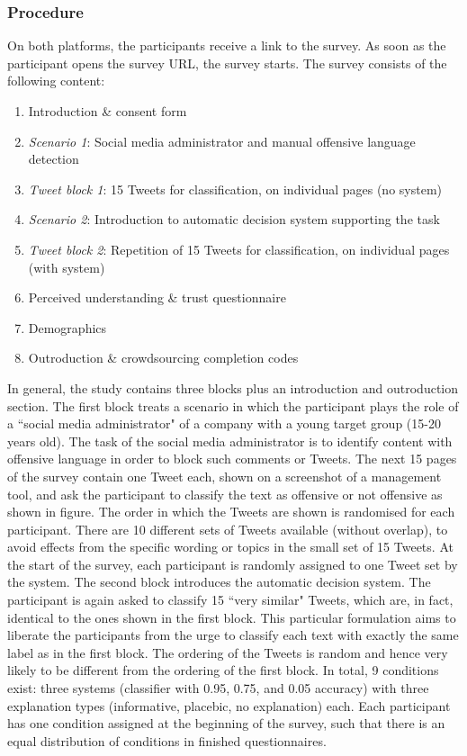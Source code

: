 \subsubsection{Procedure}
On both platforms, the participants receive a link to the survey. As soon as the participant opens the survey URL, the survey starts. The survey consists of the following content:
\begin{enumerate}
	\item Introduction \& consent form
	\item \textit{Scenario 1}: Social media administrator and manual offensive language detection
	\item \textit{Tweet block 1}: 15 Tweets for classification, on individual pages (no system)
	\item \textit{Scenario 2}: Introduction to automatic decision system supporting the task
	\item \textit{Tweet block 2}: Repetition of 15 Tweets for classification, on individual pages (with system)
	\item Perceived understanding \& trust questionnaire
	\item Demographics
	\item Outroduction \& crowdsourcing completion codes
\end{enumerate}
In general, the study contains three blocks plus an introduction and outroduction section. The first block treats a scenario in which the participant plays the role of a ``social media administrator" of a company with a young target group (15-20 years old). The task of the social media administrator is to identify content with offensive language in order to block such comments or Tweets. The next 15 pages of the survey contain one Tweet each, shown on a screenshot of a management tool, and ask the participant to classify the text as offensive or not offensive as shown in figure. The order in which the Tweets are shown is randomised for each participant. There are 10 different sets of Tweets available (without overlap), to avoid effects from the specific wording or topics in the small set of 15 Tweets. At the start of the survey, each participant is randomly assigned to one Tweet set by the system.\newline
The second block introduces the automatic decision system. The participant is again asked to classify 15 ``very similar" Tweets, which are, in fact, identical to the ones shown in the first block. This particular formulation aims to liberate the participants from the urge to classify each text with exactly the same label as in the first block. The ordering of the Tweets is random and hence very likely to be different from the ordering of the first block. In total, 9 conditions exist: three systems (classifier with 0.95, 0.75, and 0.05 accuracy) with three explanation types (informative, placebic, no explanation) each. Each participant has one condition assigned at the beginning of the survey, such that there is an equal distribution of conditions in finished questionnaires. \newline
